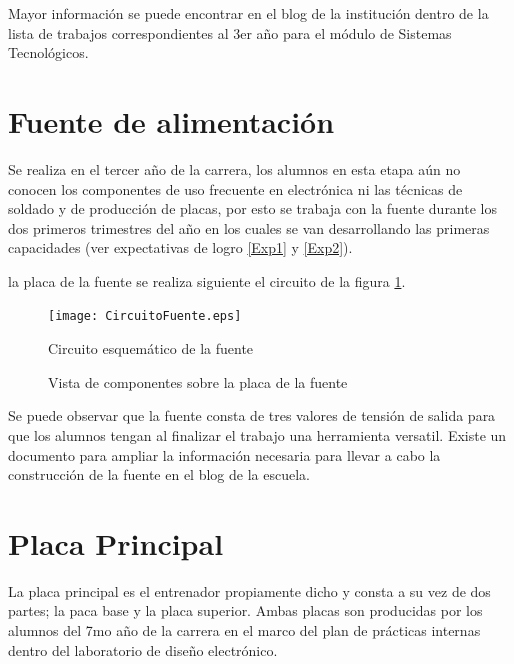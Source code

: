 Mayor información se puede encontrar en el blog de la institución dentro de la lista de trabajos correspondientes al 3er año para el módulo de Sistemas Tecnológicos. 


\section{Fuente de alimentación}
Se realiza en el tercer año de la carrera, los alumnos en esta etapa aún no conocen los componentes de uso frecuente en electrónica ni las técnicas de soldado y de producción de placas, por esto se trabaja con la fuente durante los dos primeros trimestres del año en los cuales se van desarrollando las primeras capacidades (ver expectativas de logro \ref{Exp1} y \ref{Exp2}).

la placa de la fuente se realiza siguiente el circuito de la figura \ref{CircuitoFuente}.

\begin{figure}[ht]
	\texttt{[image: CircuitoFuente.eps]}\caption{Circuito esquemático de la fuente}\label{CircuitoFuente}
\end{figure}
\begin{figure}[ht]
	\caption{Vista de componentes sobre la placa de la fuente}\label{LadoComponentesFuente}
\end{figure}

Se puede observar que la fuente consta de tres valores de tensión de salida para que los alumnos tengan al finalizar el trabajo una herramienta versatil. Existe un documento para ampliar la información necesaria para llevar a cabo la construcción de la fuente en el blog de la escuela.

\section{Placa Principal}
La placa principal es el entrenador propiamente dicho y consta a su vez de dos partes; la paca base y la placa superior. Ambas placas son producidas por los alumnos del 7mo año de la carrera en el marco del plan de prácticas internas dentro del laboratorio de diseño electrónico.
